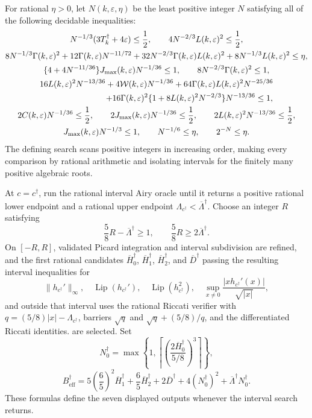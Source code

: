 For rational \(\eta>0\), let \(N(k,\varepsilon,\eta)\) be the least positive integer \(N\) satisfying all of the following decidable inequalities:
\[
\begin{gathered}
N^{-1/3}(3T_k^\dagger+4\varepsilon)\le\frac12,
\qquad
4N^{-2/3}L(k,\varepsilon)^2\le\frac12,\\
8N^{-1/3}\Gamma(k,\varepsilon)^2
+12\Gamma(k,\varepsilon)N^{-11/72}
+32N^{-2/3}\Gamma(k,\varepsilon)L(k,\varepsilon)^2
+8N^{-1/3}L(k,\varepsilon)^2\le\eta,\\
\{4+4N^{-11/36}\}J_{\max}(k,\varepsilon)N^{-1/36}\le1,
\qquad
8N^{-2/3}\Gamma(k,\varepsilon)^2\le1,\\
16L(k,\varepsilon)^2N^{-13/36}
+4\mathcal W(k,\varepsilon)N^{-1/36}
+64\Gamma(k,\varepsilon)L(k,\varepsilon)^2N^{-25/36}\\
\hspace{28mm}
+16\Gamma(k,\varepsilon)^2
\{1+8L(k,\varepsilon)^2N^{-2/3}\}N^{-13/36}\le1,\\
2C(k,\varepsilon)N^{-1/36}\le\frac12,
\qquad
2J_{\max}(k,\varepsilon)N^{-1/36}\le\frac12,
\qquad
2L(k,\varepsilon)^2N^{-13/36}\le\frac12,\\
J_{\max}(k,\varepsilon)N^{-1/3}\le1,
\qquad N^{-1/6}\le\eta,
\qquad 2^{-N}\le\eta.
\end{gathered}
\]
The defining search scans positive integers in increasing order, making every comparison by rational arithmetic and isolating intervals for the finitely many positive algebraic roots.

At \(c=c^\dagger\), run the rational interval Airy oracle until it returns a positive rational lower endpoint and a rational upper endpoint
\(\Lambda_{c^\dagger}<\overline\Lambda^\dagger\).  Choose an integer
\(R\) satisfying
\[
\frac58R-\overline\Lambda^\dagger\ge1,
\qquad
\frac58R\ge2\overline\Lambda^\dagger.
\]
On \([-R,R]\), validated Picard integration and interval subdivision are refined, and the first rational candidates
\(\overline H_0^\dagger\), \(\overline H_1^\dagger\),
\(\overline H_2^\dagger\), and \(\overline D^\dagger\) passing the resulting interval inequalities for
\[
\|h_{c^\dagger}'\|_\infty,
\quad \operatorname{Lip}(h_{c^\dagger}'),
\quad \operatorname{Lip}(h_{c^\dagger}^2),
\quad \sup_{x\ne0}\frac{|xh_{c^\dagger}'(x)|}{\sqrt{|x|}},
\]
and outside that interval uses the rational Riccati verifier with
\(q=(5/8)|x|-\Lambda_{c^\dagger}\), barriers
\(\sqrt q\) and \(\sqrt q+(5/8)/q\), and the differentiated Riccati identities.
are selected.  Set
\[
N_0^\dagger=
\max\left\{1,
\left\lceil
\left(\frac{2\overline H_0^\dagger}{5/8}\right)^3
\right\rceil\right\},
\]
\[
B_{\mathrm{eff}}^\dagger=
5\left(\frac65\right)^2\overline H_1^\dagger
+\frac65\overline H_2^\dagger+2\overline D^\dagger
+4(N_0^\dagger)^2+\overline\Lambda^\dagger N_0^\dagger.
\]
These formulas define the seven displayed outputs whenever the interval search returns.

